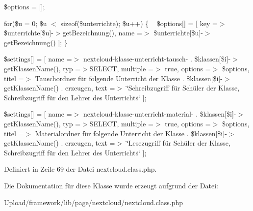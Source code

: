 \$options = \mbox{[}\mbox{]};

for(\$u = 0; \$u $<$ sizeof(\$unterrichte); \$u++) \{ ~\newline
 \$options\mbox{[}\mbox{]} = \mbox{[} \textquotesingle{}key\textquotesingle{} =$>$ \$unterrichte\mbox{[}\$u\mbox{]}-\/$>$get\+Bezeichnung(), \textquotesingle{}name\textquotesingle{} =$>$ \$unterrichte\mbox{[}\$u\mbox{]}-\/$>$get\+Bezeichnung() \mbox{]}; \}

\$settings\mbox{[}\mbox{]} = \mbox{[} \textquotesingle{}name\textquotesingle{} =$>$ \textquotesingle{}nextcloud-\/klasse-\/unterricht-\/tausch-\/\textquotesingle{} . \$klassen\mbox{[}\$i\mbox{]}-\/$>$get\+Klassen\+Name(), \textquotesingle{}typ\textquotesingle{} =$>$\textquotesingle{}S\+E\+L\+E\+CT\textquotesingle{}, \textquotesingle{}multiple\textquotesingle{} =$>$ true, \textquotesingle{}options\textquotesingle{} =$>$ \$options, \textquotesingle{}titel\textquotesingle{} =$>$ \textquotesingle{}Tauschordner für folgende Unterricht der Klasse \textquotesingle{} . \$klassen\mbox{[}\$i\mbox{]}-\/$>$get\+Klassen\+Name() . \textquotesingle{} erzeugen\textquotesingle{}, \textquotesingle{}text\textquotesingle{} =$>$ \char`\"{}\+Schreibzugriff für Schüler der Klasse, Schreibzugriff für den Lehrer des Unterrichts\char`\"{} \mbox{]};

\$settings\mbox{[}\mbox{]} = \mbox{[} \textquotesingle{}name\textquotesingle{} =$>$ \textquotesingle{}nextcloud-\/klasse-\/unterricht-\/material-\/\textquotesingle{} . \$klassen\mbox{[}\$i\mbox{]}-\/$>$get\+Klassen\+Name(), \textquotesingle{}typ\textquotesingle{} =$>$\textquotesingle{}S\+E\+L\+E\+CT\textquotesingle{}, \textquotesingle{}multiple\textquotesingle{} =$>$ true, \textquotesingle{}options\textquotesingle{} =$>$ \$options, \textquotesingle{}titel\textquotesingle{} =$>$ \textquotesingle{}Materialordner für folgende Unterricht der Klasse \textquotesingle{} . \$klassen\mbox{[}\$i\mbox{]}-\/$>$get\+Klassen\+Name() . \textquotesingle{} erzeugen\textquotesingle{}, \textquotesingle{}text\textquotesingle{} =$>$ \char`\"{}\+Lesezugriff für Schüler der Klasse, Schreibzugriff für den Lehrer des Unterrichts\char`\"{} \mbox{]}; 

Definiert in Zeile 69 der Datei nextcloud.\+class.\+php.



Die Dokumentation für diese Klasse wurde erzeugt aufgrund der Datei\+:\begin{DoxyCompactItemize}
\item 
Upload/framework/lib/page/nextcloud/nextcloud.\+class.\+php\end{DoxyCompactItemize}
